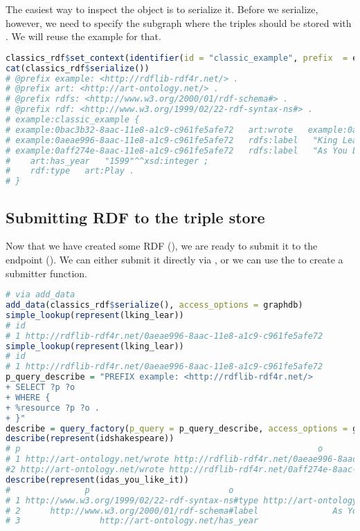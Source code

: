 

The easiest way to inspect the  object is to serialize it. Before we serialize, however, we need to specify the subgraph where the triples should be stored with . We will reuse the example for that.

\begin{lstlisting}[language=R,
basicstyle=\ttfamily\tiny]
classics_rdf$set_context(identifier(id = "classic_example", prefix  = eg))
cat(classics_rdf$serialize())
# @prefix example: <http://rdflib-rdf4r.net/> .
# @prefix art: <http://art-ontology.net/> .
# @prefix rdfs: <http://www.w3.org/2000/01/rdf-schema#> .
# @prefix rdf: <http://www.w3.org/1999/02/22-rdf-syntax-ns#> .
# example:classic_example {
# example:0bac3b32-8aac-11e8-a1c9-c961fe5afe72   art:wrote   example:0aeae996-8aac-11e8-a1c9-c961fe5afe72 ,  example:0aff274e-8aac-11e8-a1c9-c961fe5afe72 . 
# example:0aeae996-8aac-11e8-a1c9-c961fe5afe72   rdfs:label   "King Lear"@en . 
# example:0aff274e-8aac-11e8-a1c9-c961fe5afe72   rdfs:label   "As You Like It"@en ;
#	 art:has_year   "1599"^^xsd:integer ;
#	 rdf:type   art:Play .
# }
\end{lstlisting}

\subsection{Submitting RDF to the triple store}

Now that we have created some RDF (), we are ready to submit it to the endpoint (). We can either submit it directly via , or we can use the  to create a submitter function.

\begin{lstlisting}[language=R,
basicstyle=\ttfamily\tiny]
# via add_data
add_data(classics_rdf$serialize(), access_options = graphdb)
simple_lookup(represent(lking_lear))
# id
# 1 http://rdflib-rdf4r.net/0aeae996-8aac-11e8-a1c9-c961fe5afe72
simple_lookup(represent(lking_lear))
# id
# 1 http://rdflib-rdf4r.net/0aeae996-8aac-11e8-a1c9-c961fe5afe72
p_query_describe = "PREFIX example: <http://rdflib-rdf4r.net/>
+ SELECT ?p ?o
+ WHERE {
+ %resource ?p ?o .
+ }"
describe = query_factory(p_query = p_query_describe, access_options = graphdb)
describe(represent(idshakespeare))
# p                                                            o
# 1 http://art-ontology.net/wrote http://rdflib-rdf4r.net/0aeae996-8aac-11e8-a1c9-c961fe5afe72
#2 http://art-ontology.net/wrote http://rdflib-rdf4r.net/0aff274e-8aac-11e8-a1c9-c961fe5afe72
describe(represent(idas_you_like_it))
#               p                            o
# 1 http://www.w3.org/1999/02/22-rdf-syntax-ns#type http://art-ontology.net/Play
# 2      http://www.w3.org/2000/01/rdf-schema#label               As You Like It
# 3                http://art-ontology.net/has_year                         1599
\end{lstlisting}

